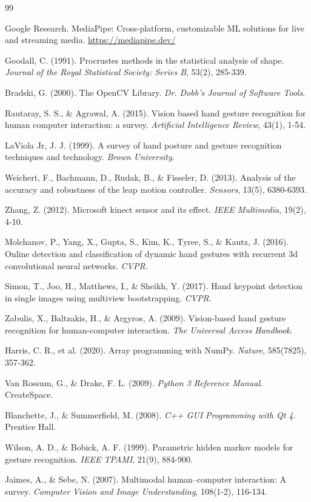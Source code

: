 \documentclass[12pt,a4paper]{report}
\begin{document}
\newpage
{}
\begin{thebibliography}{99}

Google Research. MediaPipe: Cross-platform, customizable ML solutions for live and streaming media. \url{https://mediapipe.dev/}

Goodall, C. (1991). Procrustes methods in the statistical analysis of shape. \textit{Journal of the Royal Statistical Society: Series B}, 53(2), 285-339.

Bradski, G. (2000). The OpenCV Library. \textit{Dr. Dobb's Journal of Software Tools}.

Rautaray, S. S., \& Agrawal, A. (2015). Vision based hand gesture recognition for human computer interaction: a survey. \textit{Artificial Intelligence Review}, 43(1), 1-54.

LaViola Jr, J. J. (1999). A survey of hand posture and gesture recognition techniques and technology. \textit{Brown University}.

Weichert, F., Bachmann, D., Rudak, B., \& Fisseler, D. (2013). Analysis of the accuracy and robustness of the leap motion controller. \textit{Sensors}, 13(5), 6380-6393.

Zhang, Z. (2012). Microsoft kinect sensor and its effect. \textit{IEEE Multimedia}, 19(2), 4-10.

Molchanov, P., Yang, X., Gupta, S., Kim, K., Tyree, S., \& Kautz, J. (2016). Online detection and classification of dynamic hand gestures with recurrent 3d convolutional neural networks. \textit{CVPR}.

Simon, T., Joo, H., Matthews, I., \& Sheikh, Y. (2017). Hand keypoint detection in single images using multiview bootstrapping. \textit{CVPR}.

Zabulis, X., Baltzakis, H., \& Argyros, A. (2009). Vision-based hand gesture recognition for human-computer interaction. \textit{The Universal Access Handbook}.

Harris, C. R., et al. (2020). Array programming with NumPy. \textit{Nature}, 585(7825), 357-362.

Van Rossum, G., \& Drake, F. L. (2009). \textit{Python 3 Reference Manual}. CreateSpace.

Blanchette, J., \& Summerfield, M. (2008). \textit{C++ GUI Programming with Qt 4}. Prentice Hall.

Wilson, A. D., \& Bobick, A. F. (1999). Parametric hidden markov models for gesture recognition. \textit{IEEE TPAMI}, 21(9), 884-900.

Jaimes, A., \& Sebe, N. (2007). Multimodal human–computer interaction: A survey. \textit{Computer Vision and Image Understanding}, 108(1-2), 116-134.

\end{thebibliography}
\end{document}
